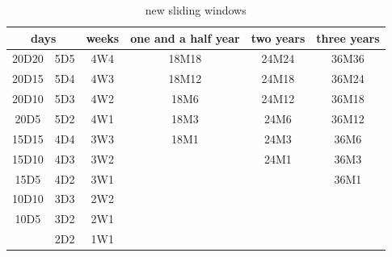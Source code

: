\documentclass[../Proposed Method.tex]{subfiles}
\begin{document}
\begin{table}[H]
    \centering
    \caption{new sliding windows}
    \label{new_sw}
    \footnotesize
    \begin{tabularx}{0.7\textwidth}{cc@{\extracolsep{\fill}}cccc}
        \toprule
        \multicolumn{2}{c}{\textbf{days}} & \textbf{weeks} & \textbf{one and a half year} & \textbf{two years} & \textbf{three years}         \\
        \midrule
        20D20                             & 5D5            & 4W4                          & 18M18              & 24M24                & 36M36 \\
        20D15                             & 5D4            & 4W3                          & 18M12              & 24M18                & 36M24 \\
        20D10                             & 5D3            & 4W2                          & 18M6               & 24M12                & 36M18 \\
        20D5                              & 5D2            & 4W1                          & 18M3               & 24M6                 & 36M12 \\
        15D15                             & 4D4            & 3W3                          & 18M1               & 24M3                 & 36M6  \\
        15D10                             & 4D3            & 3W2                          &                    & 24M1                 & 36M3  \\
        15D5                              & 4D2            & 3W1                          &                    &                      & 36M1  \\
        10D10                             & 3D3            & 2W2                          &                    &                      &       \\
        10D5                              & 3D2            & 2W1                          &                    &                      &       \\
                                          & 2D2            & 1W1                          &                    &                      &       \\
        \bottomrule
    \end{tabularx}
\end{table}
\end{document}
